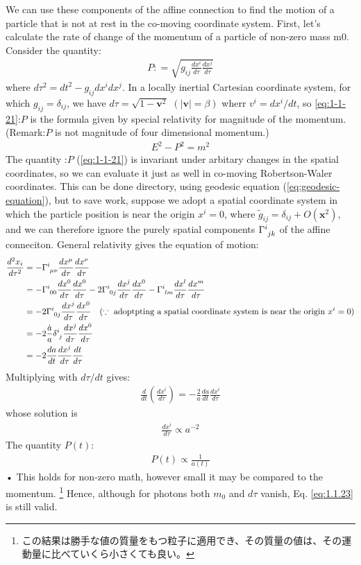 \documentclass[11pt,a4paper,dvipdfmx]{jsarticle}
\theoremstyle{plain}
\theoremstyle{break}
\newcommand{\mbv}{\mathbf{v}}
\newcommand{\mbx}{\mathbf{x}}
\newcommand{\tensorGamma}[1]{\tensor{\Gamma}{ #1}}
\begin{document}
We can use these components of the affine connection
to find the motion of a particle that is not at rest in the co-moving coordinate system.
First, let’s calculate the rate of change of the momentum of a particle of non-zero mass m0.
Consider the quantity:
\begin{align}
  P : = \sqrt{g_{ij} \frac{dx^i}{d\tau} \frac{dx^j}{d\tau}} \label{eq:1-1-21}
\end{align}
where $d\tau^2 = dt^2 -g_{ij}dx^i dx^j$.
In a locally inertial Cartesian coordinate system, for which $g_{ij} = \delta_{ij}$, we have $d\tau = \sqrt{1-\mbv^2}\,\,(|\mbv|=\beta)$ wherr $v^i = dx^i/dt$,
so \eqref{eq:1-1-21}:$P$ is the formula given by special relativity for magnitude of the momentum.(Remark:$P$ is not magnitude of four dimensional momentum.)
\begin{align}
  E^2 - P^2 = m^2
\end{align}
The quantity :$P$ (\eqref{eq:1-1-21}) is invariant under arbitary changes in the spatial coordinates, so we can evaluate it just as well in co-moving Robertson-Waler coordinates.
This can be done directory, using geodesic equation (\eqref{eq:geodesic-equation}), but to save work, suppose we adopt a spatial coordinate system in which the particle position is near the origin $x^i=0$, where $\tilde{g}_{ij} = \delta_{ij} + O(\mbx^2)$, and we can therefore ignore the purely spatial components $\tensorGamma{^i_{jk}}$ of the affine conneciton.
General relativity gives the equation of motion:
\begin{align}
  \frac{d^2 x_i}{d \tau^2}
  &= - \tensorGamma{^i_{\mu\nu}} \frac{dx^\mu}{d\tau} \frac{dx^\nu}{d\tau}\\
  &= - \tensorGamma{^i_{00}} \frac{dx^0}{d\tau} \frac{dx^0}{d\tau}
     - 2\tensorGamma{^i_{0j}} \frac{dx^j}{d\tau} \frac{dx^0}{d\tau}
     - \tensorGamma{^i_{lm}} \frac{dx^l}{d\tau} \frac{dx^m}{d\tau} \\
  &= - 2\tensorGamma{^i_{0j}} \frac{dx^j}{d\tau} \frac{dx^0}{d\tau}
       \quad(\because \,\,\text{adoptpting a spatial coordinate system is near the origin $x^i=0$} )\\
  &=-2 \frac{\dot{a}}{a} \tensor{\delta}{^i_j} \frac{dx^j}{d\tau} \frac{dx^0}{d\tau} \\
  &=-2 \frac{da}{dt} \frac{dx^j}{d\tau} \frac{dt}{d\tau}
\end{align}
Multiplying with $d\tau/dt$ gives:
\begin{align}
  \frac{d}{dt}(\frac{dx^i}{d\tau}) = -\frac{2}{a} \frac{da}{dt}\frac{dx^i}{d\tau}
\end{align}
whose solution is
\begin{align}
  \frac{dx^i}{d\tau} \propto a^{-2}
\end{align}
The quantity $P(t)$:
\begin{align}
P(t) \propto \frac{1}{a(t)} \label{eq:1.1.23}
\end{align}•%
This holds for non-zero math, however small it may be compared to the momentum. \footnote{この結果は勝手な値の質量をもつ粒子に適用でき、その質量の値は、その運動量に比べていくら小さくても良い。}
Hence, although for photons both $m_0$ and $d\tau$ vanish, Eq. \ref{eq:1.1.23} is still valid.
\end{document}
